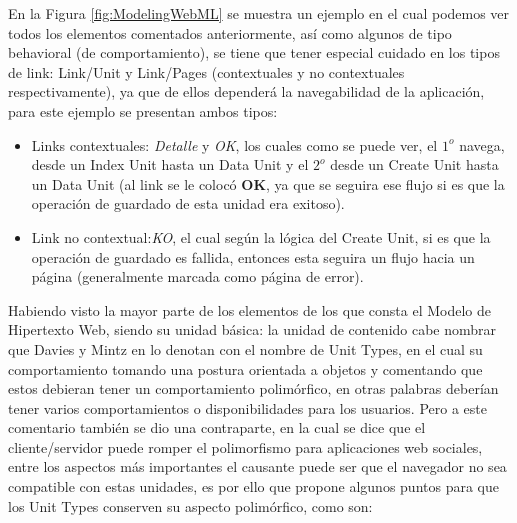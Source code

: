 \documentclass[oneside,12pt,a4paper]{memoir}%
\begin{document}
\begin{itemize}
        En la Figura \ref{fig:ModelingWebML} se muestra un ejemplo en el cual
        podemos ver todos los elementos comentados anteriormente, as\'i como
        algunos de tipo behavioral (de comportamiento), se tiene que tener
        especial cuidado en los tipos de link: Link/Unit y Link/Pages
        (contextuales y no contextuales respectivamente), ya que de ellos
        depender\'a la navegabilidad de la aplicaci\'on, para este ejemplo se
        presentan ambos tipos:
        \begin{itemize}
          \item Links contextuales: \textit{Detalle} y \textit{OK}, los cuales
          como se puede ver, el $1^o$ navega, desde un Index Unit hasta un Data
          Unit y el $2^o$ desde un Create Unit hasta un Data Unit (al link se le
          coloc\'o \textbf{OK}, ya que se seguira ese flujo si es que la
          operaci\'on de guardado de esta unidad era exitoso).
          \item Link no contextual:\textit{KO}, el cual seg\'un la l\'ogica del
          Create Unit, si es que la operaci\'on de guardado es fallida, entonces
          esta seguira un flujo hacia un p\'agina (generalmente marcada como
          p\'agina de error).
        \end{itemize}
		
		Habiendo visto la mayor parte de los elementos de los que consta el Modelo
		de Hipertexto Web, siendo su unidad b\'asica: la unidad de
		contenido cabe nombrar que Davies y Mintz en \cite{Davies2009} lo denotan con
		el nombre de Unit Types, en el cual su comportamiento
		tomando una postura orientada a objetos y comentando que estos debieran tener
		un comportamiento polim\'orfico, en otras palabras deber\'ian tener varios
		comportamientos o disponibilidades para los usuarios. Pero a este comentario
		tambi\'en se dio una contraparte, en la cual se dice que el cliente/servidor
		puede romper el polimorfismo para aplicaciones web sociales, entre los aspectos
		m\'as importantes el causante puede ser que el navegador no sea compatible con
		estas unidades, es por ello que propone algunos puntos para que los Unit Types
		conserven su aspecto polim\'orfico, como son:
		

\end{itemize}
\end{document}
